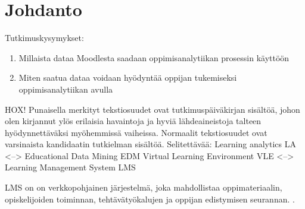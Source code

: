 \chapter{Johdanto\label{johdanto}}

Tutkimuskysymykset:
\begin{enumerate}
    \item Millaista dataa Moodlesta saadaan oppimisanalytiikan prosessin käyttöön
    \item Miten saatua dataa voidaan hyödyntää oppijan tukemiseksi oppimisanalytiikan avulla
\end{enumerate}

HOX! Punaisella merkityt tekstiosuudet ovat tutkimuspäiväkirjan sisältöä, johon olen kirjannut ylös erilaisia havaintoja ja hyviä lähdeaineistoja talteen hyödynnettäväksi myöhemmissä vaiheissa. Normaalit tekstiosuudet ovat varsinaista kandidaatin tutkielman sisältöä.
\color{red}
Selitettävää:
Learning analytics LA <--> Educational Data Mining EDM
Virtual Learning Environment VLE <--> Learning Management System LMS

LMS on on verkkopohjainen järjestelmä, joka mahdollistaa oppimateriaalin, opiskelijoiden toiminnan, tehtävätyökalujen ja oppijan edistymisen seurannan. \citep{mohdChoosingRightLearning2016}. \citep{romeroSurveyPreProcessingEducational2014}
\color{black}